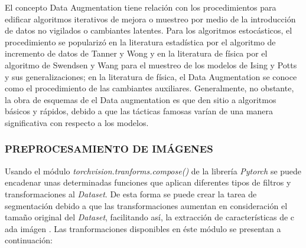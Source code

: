 			El concepto Data Augmentation tiene relación con los procedimientos para edificar algoritmos iterativos de mejora o muestreo por medio de la introducción de datos no vigilados o cambiantes latentes. Para los algoritmos estocásticos, el procedimiento se popularizó en la literatura estadística por el algoritmo de incremento de datos de Tanner y Wong y en la literatura de física por el algoritmo de Swendsen y Wang para el muestreo de los modelos de Ising y Potts y sus generalizaciones; en la literatura de física, el Data Augmentation se conoce como el procedimiento de las cambiantes auxiliares. Generalmente, no obstante, la obra de esquemas de el Data augmentation es que den sitio a algoritmos básicos y rápidos, debido a que las tácticas famosas varían de una manera significativa con respecto a los modelos.\cite{van2001art}
					
			 
			\newpage
			\subsubsection{PREPROCESAMIENTO DE IMÁGENES}

			Usando el módulo \textit{torchvision.tranforms.compose()} de la librería \textit{Pytorch} se puede encadenar unas determinadas funciones que aplican diferentes tipos de filtros y transformaciones al \textit{Dataset}. De esta forma se puede crear la tarea de segmentación debido a que las transformaciones aumentan en consideración el tamaño original del \textit{Dataset}, facilitando así, la extracción de características de c ada imágen \cite{Pytorch}. Las tranformaciones disponibles en éste módulo se presentan a continuación:
			
